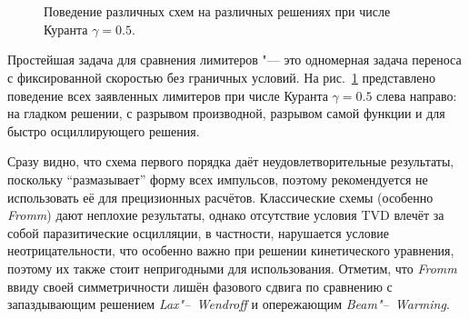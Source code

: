 \documentclass[a4paper,10pt]{article}
\begin{document}
\begin{figure}
	\\
	\\
	\centering{}
	\caption{Поведение различных схем на различных решениях при числе Куранта \(\gamma=0.5\).}\label{fig:conver}
\end{figure}

Простейшая задача для сравнения лимитеров "--- это одномерная задача переноса с фиксированной скоростью без граничных условий.
На рис.~\ref{fig:conver} представлено поведение всех заявленных лимитеров при числе Куранта \(\gamma=0.5\) слева направо:
на гладком решении, с разрывом производной, разрывом самой функции и для быстро осциллирующего решения.

Сразу видно, что схема первого порядка даёт неудовлетворительные результаты, поскольку ``размазывает'' форму всех импульсов,
поэтому рекомендуется не использовать её для прецизионных расчётов.
Классические схемы (особенно \textit{Fromm}) дают неплохие результаты, однако отсутствие условия TVD влечёт за собой паразитические осцилляции,
в частности, нарушается условие неотрицательности, что особенно важно при решении кинетического уравнения,
поэтому их также стоит непригодными для использования. Отметим, что \textit{Fromm} ввиду своей симметричности лишён фазового сдвига
по сравнению с запаздывающим решением \textit{Lax"--~Wendroff} и опережающим \textit{Beam"--~Warming}.
\end{document}
